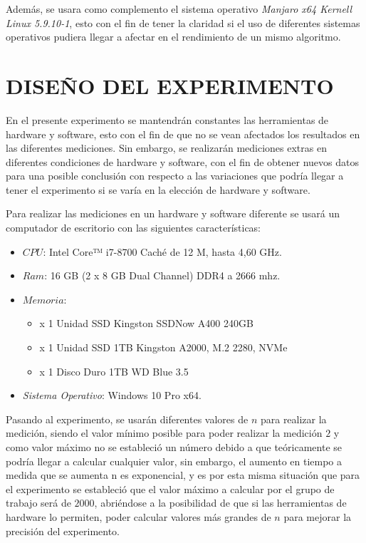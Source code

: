 \documentclass[11pt, twocolumn]{llncs}
\begin{document}
Además, se usara como complemento el sistema operativo \textit{Manjaro x64 Kernell Linux 5.9.10-1}, esto con el fin de tener la claridad si el uso de diferentes sistemas operativos pudiera llegar a afectar en el rendimiento de un mismo algoritmo.

\section{DISEÑO DEL EXPERIMENTO}\label{diseño}
En el presente experimento se mantendrán constantes las herramientas de hardware y software, esto con el fin de que no se vean afectados los resultados en las diferentes mediciones. Sin embargo, se realizarán mediciones extras en diferentes condiciones de hardware y software, con el fin de obtener nuevos datos para una posible conclusión con respecto a las variaciones que podría llegar a tener el experimento si se varía en la elección de hardware y software.

Para realizar las mediciones en un hardware y software diferente se usará un computador de escritorio con las siguientes características:

\begin{itemize}
    \item $CPU$: Intel Core™ i7-8700 Caché de 12 M, hasta 4,60 GHz.
    \item $Ram$: 16 GB (2 x 8 GB Dual Channel) DDR4 a 2666 mhz.
    \item $Memoria$:
        \begin{itemize}
             \item x 1 Unidad SSD Kingston SSDNow A400 240GB
        	 \item x 1 Unidad SSD 1TB Kingston A2000, M.2 2280, NVMe
        	 \item x 1 Disco Duro 1TB WD Blue 3.5
        \end{itemize}
    \item \textit{Sistema Operativo}: Windows 10 Pro x64.
\end{itemize}

Pasando al experimento, se usarán diferentes valores de $n$ para realizar la medición, siendo el valor mínimo posible para poder realizar la medición $2$ y como valor máximo no se estableció un número debido a que teóricamente se podría llegar a calcular cualquier valor, sin embargo, el aumento en tiempo a medida que se aumenta n es exponencial, y es por esta misma situación que para el experimento se estableció que el valor máximo a calcular por el grupo de trabajo será de $2000$, abriéndose a la posibilidad de que si las herramientas de hardware lo permiten, poder calcular valores más grandes de $n$ para mejorar la precisión del experimento.
\end{document}
